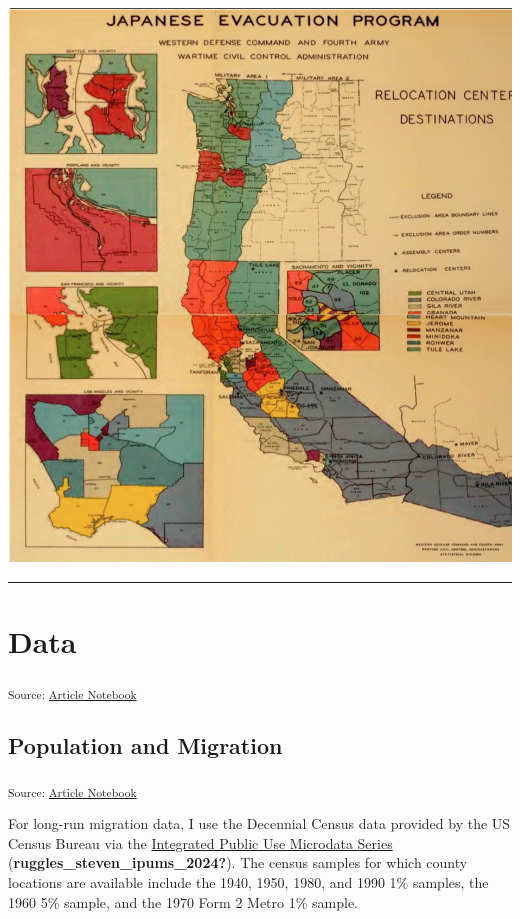 \documentclass[
]{article}
\begin{document}
\begin{center}
\includegraphics{figures/WRAzonesmap.png}
\end{center}

\begin{center}\rule{0.5\linewidth}{0.5pt}\end{center}

\section{Data}\label{data}

\textsubscript{Source:
\href{https://dyasui.github.io/FieldPaper_new/main.qmd.html}{Article
Notebook}}

\subsection{Population and Migration}\label{population-and-migration}

\textsubscript{Source:
\href{https://dyasui.github.io/FieldPaper_new/main.qmd.html}{Article
Notebook}}

For long-run migration data, I use the Decennial Census data provided by
the US Census Bureau via the
\href{https://usa.ipums.org/usa/index.shtml}{Integrated Public Use
Microdata Series} (\textbf{ruggles\_steven\_ipums\_2024?}). The census
samples for which county locations are available include the 1940, 1950,
1980, and 1990 1\% samples, the 1960 5\% sample, and the 1970 Form 2
Metro 1\% sample.
\end{document}
